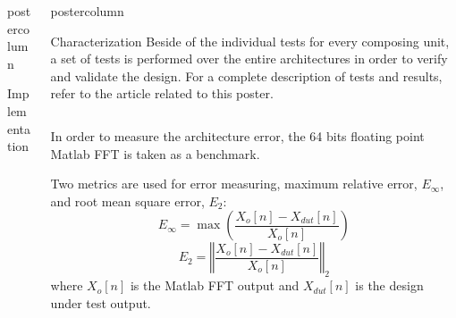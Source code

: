 \documentclass[final]{beamer}
\begin{document}
\begin{frame}{}
\begin{columns}
\begin{column}{.5\textwidth}
\begin{beamercolorbox}[center,wd=0.9\textwidth]{postercolumn}
\begin{minipage}[T]{.99\textwidth}
{\begin{block}{Implementation}
	    \end{block}

      }
      \end{minipage}
   \end{beamercolorbox}
\end{column}




\begin{column}{.5\textwidth}
   \begin{beamercolorbox}[center,wd=\textwidth]{postercolumn}
      \begin{minipage}[T]{.99\textwidth}
      \parbox[t][105cm]{\textwidth}{

		\begin{block}{Characterization}
		\justify
			Beside of the individual tests for every composing unit, a set of tests is performed over the entire architectures in order to verify and validate the design.
			For a complete description of tests and results, refer to the article related to this poster.
			
			\begin{column}{.37\textwidth}
				In order to measure the architecture error, the 64 bits floating point Matlab FFT is taken as a benchmark.

				Two metrics are used for error measuring, maximum relative error, $E_\infty$, and root mean square error, $E_2$:
				\begin{equation}
				E_\infty = \max\left(\frac{ X_o[n] - X_{dut}[n]}{X_o[n]}\right)
				\label{eq:norma1}
				\end{equation}
				\begin{equation}
				E_2 = \left\Vert\frac{X_o[n] - X_{dut}[n]}{X_o[n]}\right\Vert_2
				\label{eq:norma2}
				\end{equation}
				where $X_o[n]$ is the Matlab FFT output and $X_{dut}[n]$ is the design under test output.
				

\end{column}
\end{block}}
\end{minipage}
\end{beamercolorbox}
\end{column}
\end{columns}
\end{frame}
\end{document}
